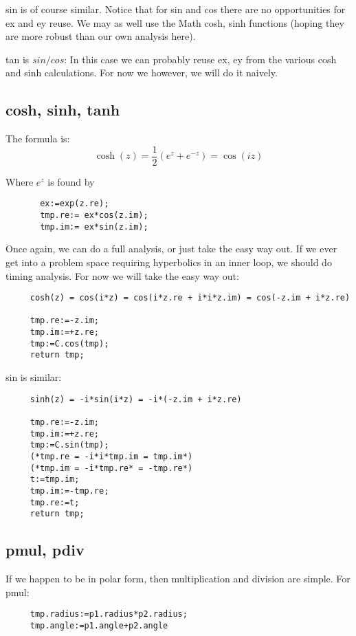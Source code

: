 sin is of course similar.  Notice that for sin and cos there
are no opportunities for ex and ey reuse.  We may as well
use the Math cosh, sinh functions (hoping they are more
robust than our own analysis here).

tan is $sin/cos$:  In this case we can probably reuse ex, ey
from the various cosh and sinh calculations. For now we
however, we will do it naively.


\subsection*{cosh, sinh, tanh}
The formula is:
\begin{equation}
  \cosh(z)=\frac{1}{2}(e^{z}+e^{-z})=\cos(i z)
\end{equation}
     
Where $e^z$ is found by
\begin{verbatim}
       ex:=exp(z.re);
       tmp.re:= ex*cos(z.im);
       tmp.im:= ex*sin(z.im);
\end{verbatim}

Once again, we can do a full analysis, or just take the easy
way out.  If we ever get into a problem space requiring
hyperbolics in an inner loop, we should do timing analysis.
For now we will take the easy way out:
\begin{verbatim}
     cosh(z) = cos(i*z) = cos(i*z.re + i*i*z.im) = cos(-z.im + i*z.re)
     
     tmp.re:=-z.im;
     tmp.im:=+z.re;
     tmp:=C.cos(tmp);
     return tmp;
\end{verbatim}

sin is similar:
\begin{verbatim}
     sinh(z) = -i*sin(i*z) = -i*(-z.im + i*z.re)
     
     tmp.re:=-z.im;
     tmp.im:=+z.re;
     tmp:=C.sin(tmp);
     (*tmp.re = -i*i*tmp.im = tmp.im*)
     (*tmp.im = -i*tmp.re* = -tmp.re*)
     t:=tmp.im;
     tmp.im:=-tmp.re;
     tmp.re:=t;
     return tmp;
\end{verbatim}

\subsection*{pmul, pdiv}
If we happen to be in polar form, then multiplication and
division are simple.  For pmul:
\begin{verbatim}
     tmp.radius:=p1.radius*p2.radius;
     tmp.angle:=p1.angle+p2.angle
\end{verbatim}

